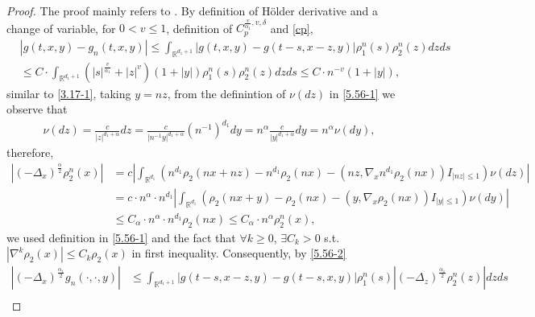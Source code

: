 \documentclass[11pt,reqno]{amsart}
\numberwithin{equation}{section}
\begin{document}
\begin{proof}
The proof mainly refers to \cite[Lemma 4.1]{RX}. By definition of  H\"{o}lder derivative and a change of variable, for $0<v\leq1$, definition of $ C_{p}^{\frac{v}{\alpha_{1}}, v,\delta }$ and \eqref{cp},
\begin{equation}
		\begin{split}
	&|g(t,x,y)-g_{n}(t,x,y)|\leq \int_{\mathbb{R}^{ d_{1}+1}}	|g(t,x,y)-g(t-s,x-z,y)|\rho_{1}^{n}(s)\rho_{2}^{n}(z)dzds\\
	&\leq C\cdot\int_{\mathbb{R}^{ d_{1}+1}}	(|s|^{\frac{v}{\alpha_{1}}}+|z|^{v})(1+|y|)\rho_{1}^{n}(s)\rho_{2}^{n}(z)dzds\leq C\cdot n^{-v}(1+|y|),
	\end{split}\nonumber
\end{equation}
similar to \eqref{3.17-1}, taking $y=nz$, from the definintion of $\nu(dz)$ in \eqref{5.56-1} we observe that 
\begin{equation}
	\begin{split} \nu(dz)=\frac{c}{|z|^{d_{1}+\alpha}}dz=\frac{c}{|n^{-1}y|^{d_{1}+\alpha}}(n^{-1})^{d_{1}}dy=n^{\alpha}\frac{c}{|y|^{d_{1}+\alpha}}dy=n^{\alpha}\nu(dy),	
	\end{split}\nonumber
\end{equation}
 therefore,
\begin{equation}\label{5.56-2}
	\begin{split}
	\left| (-\Delta_{x})^{\frac{\alpha}{2}}\rho_{2}^{n}(x)\right|& =c\left| \int_{\mathbb{R}^{d_{1}}}\left( n^{d_{1}}\rho_{2}(nx+nz)-n^{d_{1}}\rho_{2}(nx)-(nz,\nabla_{x}n^{d_{1}}\rho_{2}(nx))I_{|nz|\leq1}\right) \nu(dz)\right| 	\\
&=c\cdot n^{\alpha}\cdot n^{d_{1}}\left| \int_{\mathbb{R}^{d_{1}}}\left( \rho_{2}(nx+y)-\rho_{2}(nx)-(y,\nabla_{x}\rho_{2}(nx))I_{|y|\leq1}\right) \nu(dy)\right| \\
& \leq C_{\alpha}\cdot n^{\alpha}\cdot n^{d_{1}}\rho_{2}(nx)\leq C_{\alpha}\cdot n^{\alpha}\rho_{2}^{n}(x),
	\end{split}
\end{equation}
we used definition in \eqref{5.56-1} and the fact that $\forall k\geq 0$, $\exists C_{k}>0$ s.t. $|\nabla^{k}\rho_{2}(x)|\leq C_{k}\rho_{2}(x)$ in first inequality. Consequently, by \eqref{5.56-2}
\begin{equation}
	\begin{split}
		|	(-\Delta_{x})^{\frac{\alpha_{1}}{2}}g_{n}(\cdot,\cdot,y)|&\leq \int_{\mathbb{R}^{ d_{1}+1}}	|g(t-s,x-z,y)-g(t-s,x,y)|\rho_{1}^{n}(s)|(-\Delta_{z})^{\frac{\alpha_{1}}{2}}\rho_{2}^{n}(z)|dzds\\

\end{split}
\end{equation}
\end{proof}
\end{document}
